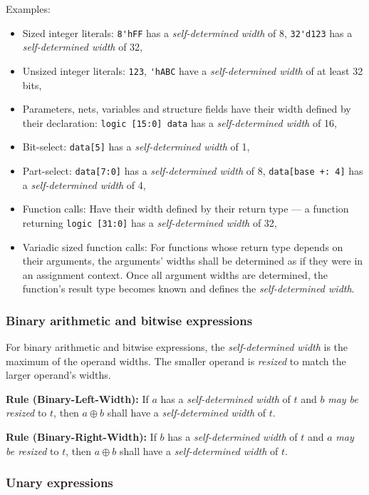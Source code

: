 \documentclass{article}
\newcommand{\sds}{\emph{self-determined width}}
\newcommand{\mbr}{\emph{may be resized}}
\newenvironment{typingrule}[1]%
{\par\noindent\textbf{Rule (#1):} }%
{\par}
\begin{document}
Examples:

\begin{itemize}
  \item Sized integer literals: \verb|8'hFF| has a \sds{} of 8,
    \verb|32'd123| has a \sds{} of 32,
  \item Unsized integer literals: \verb|123|, \verb|'hABC| have a
    \sds{} of at least 32 bits,
  \item Parameters, nets, variables and structure fields have their width
    defined by their declaration: \verb|logic [15:0] data| has a
    \sds{} of 16,
  \item Bit-select: \verb|data[5]| has a \sds{} of 1,
  \item Part-select: \verb|data[7:0]| has a \sds{} of 8,
    \verb|data[base +: 4]| has a \sds{} of 4,
  \item Function calls: Have their width defined by their return type --- a
    function returning \verb|logic [31:0]| has a
    \sds{} of 32,
  \item Variadic sized function calls: For functions whose return type depends
    on their arguments, the arguments' widths shall be determined as if
    they were in an assignment context. Once all argument widths are
    determined, the function's result type becomes known and defines the
    \sds{}.
\end{itemize}

\subsubsection{Binary arithmetic and bitwise expressions}%

For binary arithmetic and bitwise expressions, the \sds{}
is the maximum of the operand widths. The smaller operand is \emph{resized}
to match the larger operand's widths.

\begin{typingrule}{Binary-Left-Width}
  If $a$ has a \sds{} of $t$ and $b$ \mbr{}
  to $t$, then $a \oplus b$ shall have a \sds{} of $t$.
\end{typingrule}

\begin{typingrule}{Binary-Right-Width}
  If $b$ has a \sds{} of $t$ and $a$ \mbr{}
  to $t$, then $a \oplus b$ shall have a \sds{} of $t$.
\end{typingrule}

\subsubsection{Unary expressions}%
\end{document}
